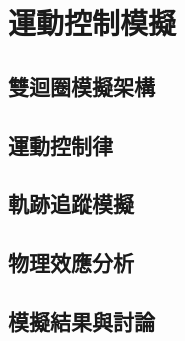 \chapter{運動控制模擬}
\label{c:motion_control}


\section{雙迴圈模擬架構}
\label{sec:dual_loop_arch}


\section{運動控制律}
\label{sec:motion_ctrl_law}


\section{軌跡追蹤模擬}
\label{sec:trajectory_sim}


\section{物理效應分析}
\label{sec:physical_effects}


\section{模擬結果與討論}
\label{sec:sim_results}

